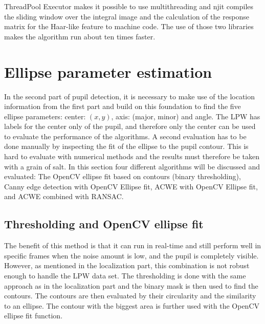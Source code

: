 ThreadPool Executor makes it possible to use multithreading and njit compiles the sliding window over the integral image and the calculation of the response matrix for the Haar-like feature to machine code. The use of those two libraries makes the algorithm run about ten times faster. 

\section{Ellipse parameter estimation}
In the second part of pupil detection, it is necessary to make use of the location information from the first part and build on this foundation to find the five ellipse parameters: center: $(x,y)$, axis: (major, minor) and angle. The LPW has labels for the center only of the pupil, and therefore only the center can be used to evaluate the performance of the algorithms. A second evaluation has to be done manually by inspecting the fit of the ellipse to the pupil contour. This is hard to evaluate with numerical methods and the results must therefore be taken with a grain of salt. In this section four different algorithms will be discussed and evaluated: The OpenCV ellipse fit based on contours (binary thresholding), Canny edge detection with OpenCV Ellipse fit,  ACWE with OpenCV Ellipse fit, and ACWE combined with RANSAC.

\subsection{Thresholding and OpenCV ellipse fit}
\label{sus:thresholding_ellipse_fit}
The benefit of this method is that it can run in real-time and still perform well in specific frames when the noise amount is low, and the pupil is completely visible. However, as mentioned in the localization part, this combination is not robust enough to handle the LPW data set. The thresholding is done with the same approach as in the localization part and the binary mask is then used to find the contours. The contours are then evaluated by their circularity and the similarity to an ellipse. The contour with the biggest area is further used with the OpenCV ellipse fit function. 

